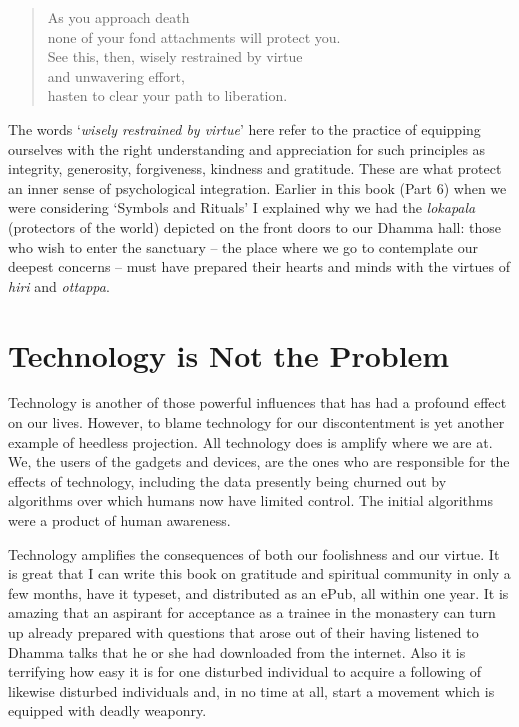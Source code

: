\begin{quote}
  As you approach death\\
  none of your fond attachments will protect you.\\
  See this, then, wisely restrained by virtue\\
  and unwavering effort,\\
  hasten to clear your path to liberation.
\end{quote}

The words `\emph{wisely restrained by virtue}' here refer to the
practice of equipping ourselves with the right understanding and
appreciation for such principles as integrity, generosity, forgiveness,
kindness and gratitude. These are what protect an inner sense of
psychological integration. Earlier in this book (Part 6) when we were
considering `Symbols and Rituals' I explained why we had the
\emph{lokapala} (protectors of the world) depicted on the front doors to
our Dhamma hall: those who wish to enter the sanctuary -- the place
where we go to contemplate our deepest concerns -- must have prepared
their hearts and minds with the virtues of \emph{hiri} and
\emph{ottappa}.

\section{Technology is Not the Problem}

Technology is another of those powerful influences that has had a
profound effect on our lives. However, to blame technology for our
discontentment is yet another example of heedless projection. All
technology does is amplify where we are at. We, the users of the gadgets
and devices, are the ones who are responsible for the effects of
technology, including the data presently being churned out by algorithms
over which humans now have limited control. The initial algorithms were
a product of human awareness.

Technology amplifies the consequences of both our foolishness and our
virtue. It is great that I can write this book on gratitude and
spiritual community in only a few months, have it typeset, and
distributed as an ePub, all within one year. It is amazing that an
aspirant for acceptance as a trainee in the monastery can turn up
already prepared with questions that arose out of their having listened
to Dhamma talks that he or she had downloaded from the internet. Also it
is terrifying how easy it is for one disturbed individual to acquire a
following of likewise disturbed individuals and, in no time at all,
start a movement which is equipped with deadly weaponry.

